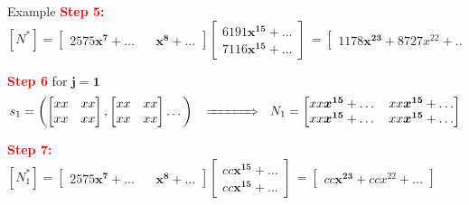 \documentclass[final]{beamer}
\newlength{\twocolwid}
\begin{document}
\begin{frame}[t]
\begin{columns}[t]
\begin{column}{\twocolwid}
\begin{block}{Example}
		\textcolor{red}{\bf Step 5:}
		$  [N^*] = \begin{bmatrix}
		2575\boldsymbol{x^7}+\dots ~~&~~ \boldsymbol{x^8} + \dots
		\end{bmatrix}
                \begin{bmatrix}
		6191\boldsymbol{x^{15}} + \dots\\
		7116\boldsymbol{x^{15}} + \dots
		\end{bmatrix}\,
=                \begin{bmatrix}
  1178\boldsymbol{x^{23}} + 8727x^{22} + \dots
\end{bmatrix}
		$

		\textcolor{red}{\bf Step 6} for $\boldsymbol{j = 1}$
	$$ s_1 = \left(
		\begin{bmatrix}
		xx  &xx\\
		xx& xx
		\end{bmatrix},
		\begin{bmatrix}
		xx&xx\\
		xx&xx
		\end{bmatrix}
		\dots
		\right)\,
                ~~\xRightarrow{~~~~~~~~~~}~~
		N_1 = \begin{bmatrix}
		xx\boldsymbol{x^{15}} + \dots & xx\boldsymbol{x^{15}} + \dots\\
		xx\boldsymbol{x^{15}} + \dots & xx\boldsymbol{x^{15}} + \dots
		\end{bmatrix}
		$$
	
		\textcolor{red}{\bf Step 7:}
		$  [N_1^*] = \begin{bmatrix}
		2575\boldsymbol{x^7}+\dots ~~&~~ \boldsymbol{x^8} + \dots
		\end{bmatrix}
                \begin{bmatrix}
		cc\boldsymbol{x^{15}} + \dots\\
		cc\boldsymbol{x^{15}} + \dots
		\end{bmatrix}\,
=                \begin{bmatrix}
  cc\boldsymbol{x^{23}} + ccx^{22} + \dots
\end{bmatrix}
		$

	


\end{block}
\end{column}
\end{columns}
\end{frame}
\end{document}
